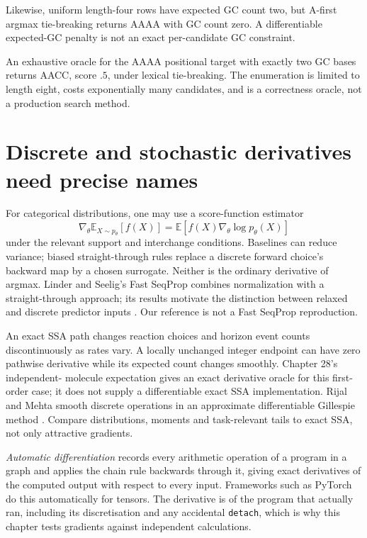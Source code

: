 Likewise, uniform length-four rows have expected GC count two, but A-first
argmax tie-breaking returns AAAA with GC count zero. A differentiable expected-GC
penalty is not an exact per-candidate GC constraint.
\par\medskip\noindent\begin{minipage}{\linewidth}
\end{minipage}\par\medskip
An exhaustive oracle for the AAAA positional target with exactly two GC bases
returns AACC, score $.5$, under lexical tie-breaking. The enumeration is limited
to length eight, costs exponentially many candidates, and is a correctness oracle,
not a production search method.

\section{Discrete and stochastic derivatives need precise names}
For categorical distributions, one may use a score-function estimator
\[
 \nabla_\theta\mathbb E_{X\sim p_\theta}[f(X)]
 =\mathbb E[f(X)\nabla_\theta\log p_\theta(X)]
\]
under the relevant support and interchange conditions. Baselines can reduce
variance; biased straight-through rules replace a discrete forward choice's
backward map by a chosen surrogate. Neither is the ordinary derivative of
argmax. Linder and Seelig's Fast SeqProp combines normalization with a
straight-through approach; its results motivate the distinction between relaxed
and discrete predictor inputs \cite{LinderSeelig2021}. Our reference is not a
Fast SeqProp reproduction.

An exact SSA path changes reaction choices and horizon event counts discontinuously
as rates vary. A locally unchanged integer endpoint can have zero pathwise
derivative while its expected count changes smoothly. Chapter 28's independent-
molecule expectation gives an exact derivative oracle for this first-order case;
it does not supply a differentiable exact SSA implementation.
Rijal and Mehta smooth discrete operations in an approximate differentiable
Gillespie method \cite{RijalMehta2025}. Compare distributions, moments and task-relevant
tails to exact SSA, not only attractive gradients.

\begin{CSBridge}
\emph{Automatic differentiation} records every arithmetic operation of a program
in a graph and applies the chain rule backwards through it, giving exact
derivatives of the computed output with respect to every input. Frameworks such
as PyTorch do this automatically for tensors. The derivative is of the program
that actually ran, including its discretisation and any accidental
\texttt{detach}, which is why this chapter tests gradients against independent
calculations.
\end{CSBridge}

